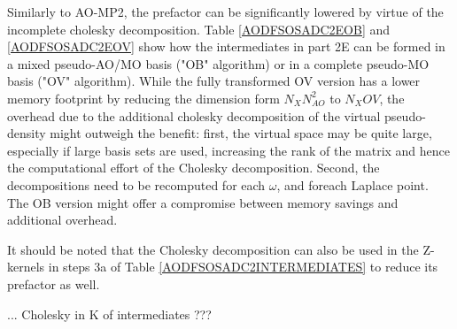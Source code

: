 Similarly to AO-MP2, the prefactor can be significantly lowered by virtue of the incomplete cholesky decomposition. Table \ref{AODFSOSADC2EOB} and \ref{AODFSOSADC2EOV} show how the intermediates in part 2E can be formed in a mixed pseudo-AO/MO basis ("OB" algorithm) or in a complete pseudo-MO basis ("OV" algorithm). While the fully transformed OV version has a lower memory footprint by reducing the dimension form $N_XN_{AO}^2$ to $N_XOV$, the overhead due to the additional cholesky decomposition of the virtual pseudo-density might outweigh the benefit: first, the virtual space may be quite large, especially if large basis sets are used, increasing the rank of the matrix and hence the computational effort of the Cholesky decomposition. Second, the decompositions need to be recomputed for each $\omega$, and foreach Laplace point. The OB version might offer a compromise between memory savings and additional overhead. 

It should be noted that the Cholesky decomposition can also be used in the Z-kernels in steps 3a of Table \ref{AODFSOSADC2INTERMEDIATES} to reduce its prefactor as well. 

... Cholesky in K of intermediates ???

